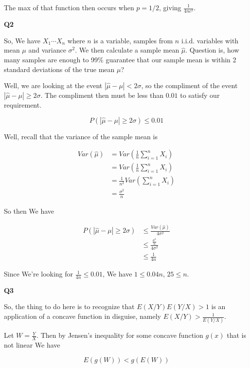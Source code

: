 \documentclass{article}
\begin{document}
			The max of that function then occurs when $p=1/2$, giving $\frac{1}{4nc^2}$.
			
			\hfill
			
		\textbf{Q2}
		
			So, We have $X_1\cdots X_n$ where $n$ is a variable, samples from $n$ i.i.d. variables with mean $\mu$ and variance $\sigma^2$. We then calculate a sample mean $\hat{\mu}$. Question is, how many samples are enough to 99\% guarantee that our sample mean is within 2 standard deviations of the true mean $\mu$?
			
			Well, we are looking at the event $|\hat{\mu} - \mu| < 2\sigma$, so the compliment of the event $|\hat{\mu} - \mu| \ge 2\sigma$. The compliment then must be less than $0.01$ to satisfy our requirement.
			
			\[ P(|\hat{\mu} - \mu| \ge 2\sigma) \le 0.01 \]
			
			Well, recall that the variance of the sample mean is
			
			\begin{align*}
			Var(\hat{\mu}) &= Var\left(\frac{1}{n}\sum^n_{i=1} X_i \right)\\
			&= Var\left(\frac{1}{n}\sum^n_{i=1} X_i \right)\\
			&= \frac{1}{n^2}Var\left(\sum^n_{i=1} X_i \right)\\
			&= \frac{\sigma^2}{n}
			\end{align*}
			
			So then We have
			
			\begin{align*}
			P(|\hat{\mu} - \mu| \ge 2\sigma) &\le \frac{Var(\hat{\mu})}{4\sigma^2} \\
			&\le \frac{\frac{\sigma^2}{n}}{4\sigma^2}\\
			&\le \frac{1}{4n}
			\end{align*}
			
			Since We're looking for $\frac{1}{4n} \le 0.01$, We have $1\le 0.04n$, $25\le n$.
			
			\hfill
			
		\textbf{Q3}
		
			So, the thing to do here is to recognize that $E(X/Y)E(Y/X) > 1$ is an application of a concave function in disguise, namely $E(X/Y)> \frac{1}{E(Y/X)}$.
			
			Let $W=\frac{Y}{X}$. Then by Jensen's inequality for some concave function $g(x)$ that is not linear We have
			
			\[ E(g(W)) < g(E(W)) \]
			
\end{document}
